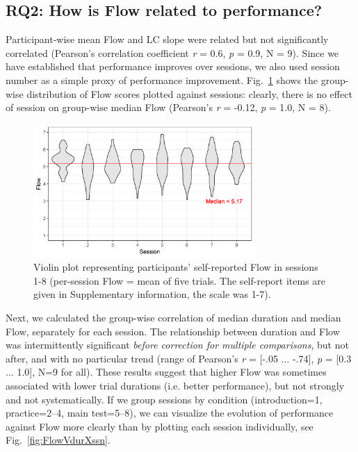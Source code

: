 \documentclass[fleqn,10pt]{wlscirep}
\newcommand{\nicewidth}{0.75\textwidth}
\begin{document}
\subsection*{RQ2: How is Flow related to performance?}

Participant-wise mean Flow and LC slope were related but not significantly correlated (Pearson's correlation coefficient {\it r} = 0.6, {\it p} = 0.9, N = 9). %
Since we have established that performance improves over sessions, we also used session number as a simple proxy of performance improvement. Fig.~\ref{fig:FlowVssn} shows the group-wise distribution of Flow scores plotted against sessions: clearly, there is no effect of session on group-wise median Flow (Pearson's {\it r} = -0.12, {\it p} = 1.0, N = 8).%

\begin{figure}[!ht]
	\centering
	\includegraphics[width=\nicewidth]{session_fss2}
	\caption{Violin plot representing participants' self-reported Flow in sessions 1-8 (per-session Flow = mean of five trials. The self-report items are given in Supplementary information, the scale was 1-7).}
	\label{fig:FlowVssn}
\end{figure}

Next, we calculated the group-wise correlation of median duration and median Flow, separately for each session. The relationship between duration and Flow was intermittently significant {\it before correction for multiple comparisons}, but not after, and with no particular trend (range of Pearson's {\it r} = [-.05 $\dots$ -.74], {\it p} = [0.3 $\dots$ 1.0], N=9 for all). These results suggest that higher Flow was sometimes associated with lower trial durations (i.e. better performance), but not strongly and not systematically. If we group sessions by condition (introduction=1, practice=2--4, main test=5--8), we can visualize the evolution of performance against Flow more clearly than by plotting each session individually, see Fig.~\ref{fig:FlowVdurXssn}.%
\end{document}
